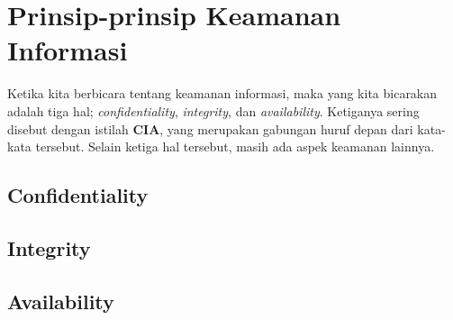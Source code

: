 \chapter{Prinsip-prinsip Keamanan Informasi}
Ketika kita berbicara tentang keamanan informasi, maka yang kita
bicarakan adalah tiga hal;
{\em confidentiality}, {\em integrity}, dan {\em availability}.
Ketiganya sering disebut dengan istilah \textbf{CIA},
yang merupakan gabungan huruf depan dari kata-kata tersebut.
Selain ketiga hal tersebut, masih ada aspek keamanan lainnya.

\section{Confidentiality}

\section{Integrity}

\section{Availability}
